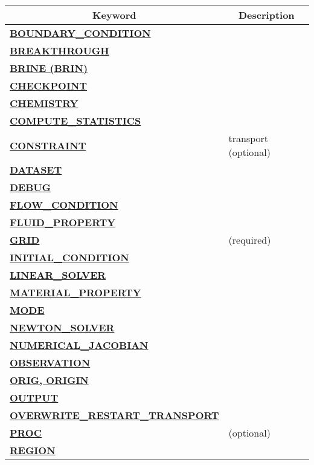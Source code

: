 \documentclass[12pt]{article}
\begin{document}
\begin{longtable}{ll}%


\toprule[1.5pt]
\multicolumn{1}{c}{\bf Keyword} & \multicolumn{1}{c}{\bf Description}\\
\midrule[1pt]
\hyperlink{target_bcon}{\bf BOUNDARY\_CONDITION} & \\
\hyperlink{target_brk}{\bf BREAKTHROUGH} & \\
\hyperlink{target_brine}{\bf BRINE (BRIN)} & \\
\hyperlink{target_ckpt}{\bf CHECKPOINT} & \\
\hyperlink{target_chem}{\bf CHEMISTRY} & \\
\hyperlink{target_stat}{\bf COMPUTE\_STATISTICS} & \\
\hyperlink{target_constraint}{\bf CONSTRAINT} & transport (optional)\\
\hyperlink{target_datset}{\bf DATASET} & \\
\hyperlink{target_dbg}{\bf DEBUG} & \\
\hyperlink{target_flow_cond}{\bf FLOW\_CONDITION} & \\
\hyperlink{target_fluid_property}{\bf FLUID\_PROPERTY} & \\
\hyperlink{target_grid}{\bf GRID} & (required)\\
\hyperlink{target_init}{\bf INITIAL\_CONDITION} & \\
\hyperlink{target_linsolv}{\bf LINEAR\_SOLVER} & \\
\hyperlink{target_mat}{\bf MATERIAL\_PROPERTY} & \\
\hyperlink{target_mode}{\bf MODE} & \\
\hyperlink{target_newt}{\bf NEWTON\_SOLVER} & \\
\hyperlink{target_numjac}{\bf NUMERICAL\_JACOBIAN} & \\
\hyperlink{target_observation}{\bf OBSERVATION} & \\
\hyperlink{target_orig}{\bf ORIG, ORIGIN} & \\
\hyperlink{target_output}{\bf OUTPUT} & \\
\hyperlink{target_overwrite}{\bf OVERWRITE\_RESTART\_TRANSPORT} & \\
\hyperlink{target_proc}{\bf PROC} & (optional)\\
\hyperlink{target_region}{\bf REGION} & \\

\end{longtable}
\end{document}

